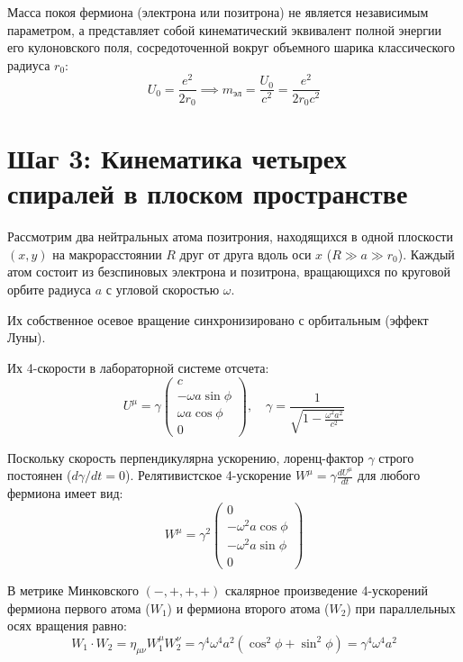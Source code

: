 \documentclass[12pt,a4paper]{article}
\begin{document}
Масса покоя фермиона (электрона или позитрона) не является независимым параметром, а представляет собой кинематический эквивалент полной энергии его кулоновского поля, сосредоточенной вокруг объемного шарика классического радиуса $r_0$:
\begin{equation}
U_0 = \frac{e^2}{2r_0} \implies m_{эл} = \frac{U_0}{c^2} = \frac{e^2}{2r_0 c^2}
\end{equation}

\section*{Шаг 3: Кинематика четырех спиралей в плоском пространстве}

Рассмотрим два нейтральных атома позитрония, находящихся в одной плоскости $(x, y)$ на макрорасстоянии $R$ друг от друга вдоль оси $x$ ($R \gg a \gg r_0$). Каждый атом состоит из безспиновых электрона и позитрона, вращающихся по круговой орбите радиуса $a$ с угловой скоростью $\omega$.

Их собственное осевое вращение синхронизировано с орбитальным (эффект Луны).

Их 4-скорости в лабораторной системе отсчета:
\begin{equation}
U^\mu = \gamma \begin{pmatrix} c \\ -\omega a \sin\phi \\ \omega a \cos\phi \\ 0 \end{pmatrix}, \quad \gamma = \frac{1}{\sqrt{1 - \frac{\omega^2 a^2}{c^2}}}
\end{equation}

Поскольку скорость перпендикулярна ускорению, лоренц-фактор $\gamma$ строго постоянен ($d\gamma/dt = 0$). Релятивистское 4-ускорение $W^\mu = \gamma \frac{dU^\mu}{dt}$ для любого фермиона имеет вид:
\begin{equation}
W^\mu = \gamma^2 \begin{pmatrix} 0 \\ -\omega^2 a \cos\phi \\ -\omega^2 a \sin\phi \\ 0 \end{pmatrix}
\end{equation}

В метрике Минковского $(-, +, +, +)$ скалярное произведение 4-ускорений фермиона первого атома ($W_1$) и фермиона второго атома ($W_2$) при параллельных осях вращения равно:
\begin{equation}
W_1 \cdot W_2 = \eta_{\mu\nu} W_1^\mu W_2^\nu = \gamma^4 \omega^4 a^2 (\cos^2\phi + \sin^2\phi) = \gamma^4 \omega^4 a^2
\end{equation}
\end{document}
